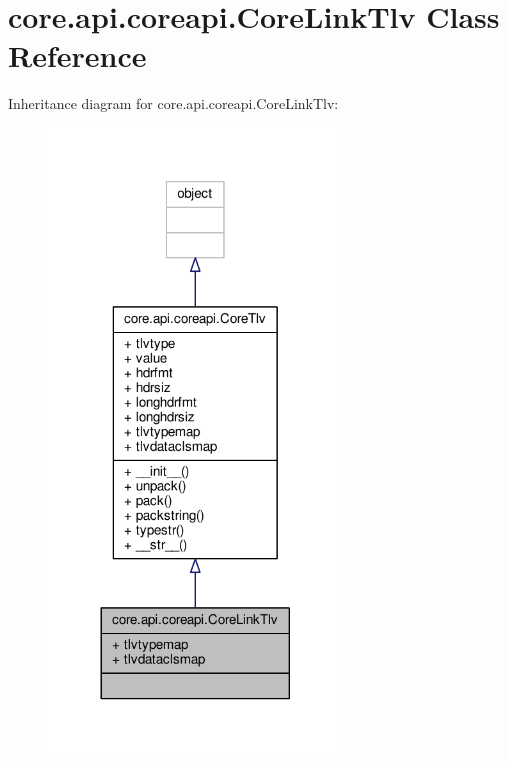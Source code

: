 \hypertarget{classcore_1_1api_1_1coreapi_1_1_core_link_tlv}{\section{core.\+api.\+coreapi.\+Core\+Link\+Tlv Class Reference}
\label{classcore_1_1api_1_1coreapi_1_1_core_link_tlv}
}


Inheritance diagram for core.\+api.\+coreapi.\+Core\+Link\+Tlv\+:
\nopagebreak
\begin{figure}[H]
\begin{center}
\leavevmode
\includegraphics[width=221pt]{classcore_1_1api_1_1coreapi_1_1_core_link_tlv__inherit__graph}
\end{center}
\end{figure}


